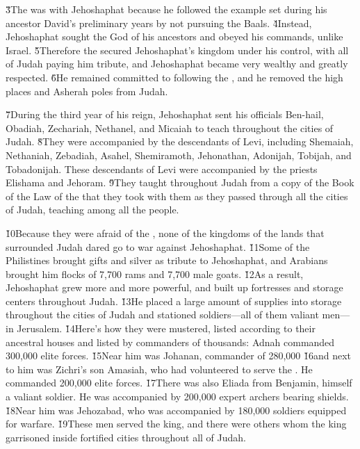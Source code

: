 \v{3}The  was with Jehoshaphat because he followed the example set during his ancestor David's preliminary years by not pursuing the Baals. \v{4}Instead, Jehoshaphat sought the God of his ancestors and obeyed his commands, unlike Israel. \v{5}Therefore the  secured Jehoshaphat's kingdom under his control, with all of Judah paying him tribute, and Jehoshaphat became very wealthy and greatly respected. \v{6}He remained committed to following the , and he removed the high places and Asherah poles from Judah.

\v{7}During the third year of his reign, Jehoshaphat sent his officials Ben-hail, Obadiah, Zechariah, Nethanel, and Micaiah to teach throughout the cities of Judah. \v{8}They were accompanied by the descendants of Levi, including Shemaiah, Nethaniah, Zebadiah, Asahel, Shemiramoth, Jehonathan, Adonijah, Tobijah, and Tobadonijah. These descendants of Levi were accompanied by the priests Elishama and Jehoram. \v{9}They taught throughout Judah from a copy of the Book of the Law of the  that they took with them as they passed through all the cities of Judah, teaching among all the people.

\v{10}Because they were afraid of the , none of the kingdoms of the lands that surrounded Judah dared go to war against Jehoshaphat. \v{11}Some of the Philistines brought gifts and silver as tribute to Jehoshaphat, and Arabians brought him flocks of 7,700 rams and 7,700 male goats. \v{12}As a result, Jehoshaphat grew more and more powerful, and built up fortresses and storage centers throughout Judah. \v{13}He placed a large amount of supplies into storage throughout the cities of Judah and stationed soldiers---all of them valiant men---in Jerusalem. \v{14}Here's how they were mustered, listed according to their ancestral houses and listed by commanders of thousands: Adnah commanded 300,000 elite forces. \v{15}Near him was Johanan, commander of 280,000 \v{16}and next to him was Zichri's son Amasiah, who had volunteered to serve the . He commanded 200,000 elite forces. \v{17}There was also Eliada from Benjamin, himself a valiant soldier. He was accompanied by 200,000 expert archers bearing shields. \v{18}Near him was Jehozabad, who was accompanied by 180,000 soldiers equipped for warfare. \v{19}These men served the king, and there were others whom the king garrisoned inside fortified cities throughout all of Judah.


